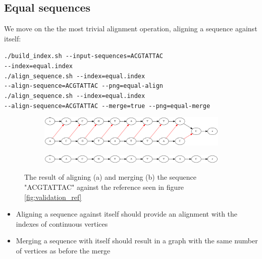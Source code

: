 \documentclass[thesis.tex]{subfiles}
\begin{document}
\subsection*{Equal sequences}
We move on the the most trivial alignment operation, aligning a sequence against itself:\\
\par\noindent
\texttt{./build\_index.sh -{}-input-sequences=ACGTATTAC\\
-{}-index=equal.index}\\
\texttt{./align\_sequence.sh -{}-index=equal.index\\
-{}-align-sequence=ACGTATTAC -{}-png=equal-align}\\
\texttt{./align\_sequence.sh -{}-index=equal.index\\
-{}-align-sequence=ACGTATTAC -{}-merge=true -{}-png=equal-merge}\\
\begin{figure}[!h]
  \begin{mdframed}
  \begin{subfigure}[t]{\textwidth}
      \includegraphics[width=\textwidth]{output/equal-align.png}
    \subcaption{}
  \end{subfigure}
  \begin{subfigure}[t]{\textwidth}
      \includegraphics[width=\textwidth]{output/equal-merge.png}
    \subcaption{}
  \end{subfigure} 
  \end{mdframed}
  \caption{The result of aligning (a) and merging (b) the sequence "ACGTATTAC" against the reference seen in figure \ref{fig:validation_ref}}
  \label{fig:validation_equal}
\end{figure}
\begin{itemize}
\item Aligning a sequence against itself should provide an alignment with the indexes of continuous vertices
\item Merging a sequence with itself should result in a graph with the same number of vertices as before the merge
\end{itemize}
\clearpage
\end{document}
